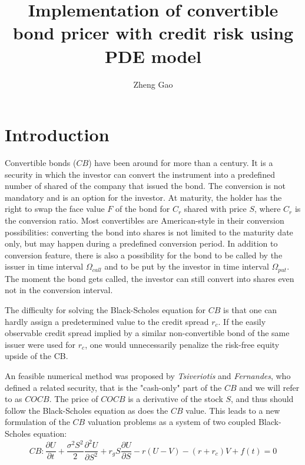 \documentclass[12pt]{article}
\begin{document}
\title{Implementation of convertible bond pricer with credit risk using PDE model}
\author{Zheng Gao}
\date{}
\maketitle

\section{Introduction\label{sec:intro}}
Convertible bonds ($CB$) have been around for more than a century. It is a security in which the investor can convert the instrument into a predefined number of shared of the company that issued the bond. The conversion is not mandatory and is an option for the investor. At maturity, the holder has the right to swap the face value $F$ of the bond for $C_r$ shared with price $S$, where $C_r$ is the conversion ratio. Most convertibles are American-style in their conversion possibilities: converting the bond into shares is not limited to the maturity date only, but may happen during a predefined conversion period. In addition to conversion feature, there is also a possibility for the bond to be called by the issuer in time interval $\Omega_{call}$ and to be put by the investor in time interval $\Omega_{put}$. The moment the bond gets called, the investor can still convert into shares even not in the conversion interval. 

The difficulty for solving the Black-Scholes equation for $CB$ is that one can hardly assign a predetermined value to the credit spread $r_c$. If the easily observable credit spread implied by a similar non-convertible bond of the same issuer were used for $r_c$, one would unnecessarily penalize the risk-free equity upside of the CB.

An feasible numerical method was proposed by \textit{Tsiveriotis} and \textit{Fernandes}, who defined a related security, that is the "cash-only" part of the $CB$ and we will refer to as $COCB$. The price of $COCB$ is a derivative of the stock $S$, and thus should follow the Black-Scholes equation as does the $CB$ value. This leads to a new formulation of the $CB$ valuation problems as a system of two coupled Black-Scholes equation:
\begin{equation}
CB: \frac{\partial{U}}{\partial{t}} + 
\frac{\sigma^2S^2}{2}\frac{\partial^2{U}}{\partial{S}^2} + r_gS\frac{\partial{U}}{\partial{S}} - r(U-V) - (r+r_c)V + f(t) = 0 
\label{eq:CB}
\end{equation}
\end{document}
